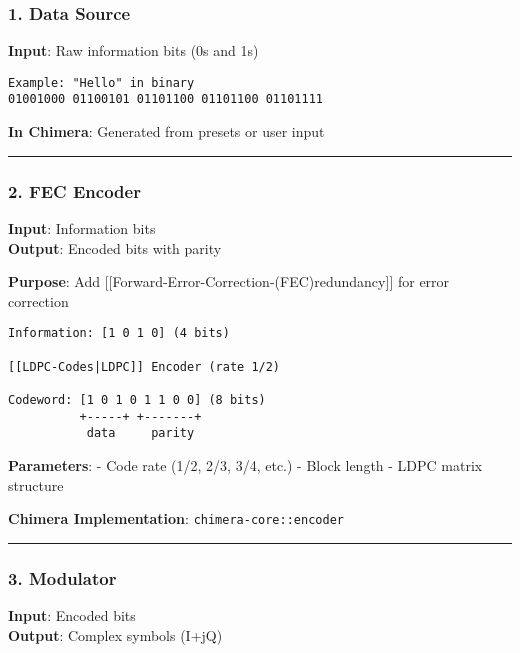 \subsubsection{1. Data Source}\label{data-source}

\textbf{Input}: Raw information bits (0s and 1s)

\begin{verbatim}
Example: "Hello" in binary
01001000 01100101 01101100 01101100 01101111
\end{verbatim}

\textbf{In Chimera}: Generated from presets or user input

\begin{center}\rule{0.5\linewidth}{0.5pt}\end{center}

\subsubsection{2. FEC Encoder}\label{fec-encoder}

\textbf{Input}: Information bits\\
\textbf{Output}: Encoded bits with parity

\textbf{Purpose}: Add
{[}{[}Forward-Error-Correction-(FEC)\textbar redundancy{]}{]} for error
correction

\begin{verbatim}
Information: [1 0 1 0] (4 bits)
      
[[LDPC-Codes|LDPC]] Encoder (rate 1/2)
      
Codeword: [1 0 1 0 1 1 0 0] (8 bits)
          +-----+ +-------+
           data     parity
\end{verbatim}

\textbf{Parameters}: - Code rate (1/2, 2/3, 3/4, etc.) - Block length -
LDPC matrix structure

\textbf{Chimera Implementation}: \texttt{chimera-core::encoder}

\begin{center}\rule{0.5\linewidth}{0.5pt}\end{center}

\subsubsection{3. Modulator}\label{modulator}

\textbf{Input}: Encoded bits\\
\textbf{Output}: Complex symbols (I+jQ)

